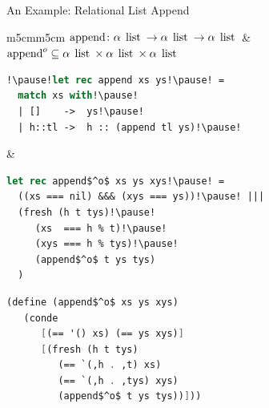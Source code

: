 \documentclass[10pt, mathserif]{beamer}
\let\\\tabularnewline
\let\\\tabularnewline
\newcommand{\oo}[1]{{#1}^o}
\newcommand{\inml}[1]{\mbox{\lstinline{#1}}}
\newcommand{\graybox}[1]{\colorbox{light-gray}{#1}}
\theoremstyle{definition}
\begin{document}
\begin{frame}[fragile]{An Example: Relational List Append}
\vskip5mm
\begin{tabular}{m{5cm}m{5cm}}
 \graybox{$\inml{append} \colon \alpha\:\inml{list} \to \alpha\:\inml{list} \to \alpha\:\inml{list}$} &
 \graybox{$\oo{\inml{append}} \subseteq \alpha\:\inml{list} \times \alpha\:\inml{list} \times \alpha\:\inml{list}$}\\
 \begin{lstlisting}[language=ocaml] 
!\pause!let rec append xs ys!\pause! = 
  match xs with!\pause!
  | []    ->  ys!\pause!
  | h::tl ->  h :: (append tl ys)!\pause!
 \end{lstlisting} &
 \begin{lstlisting}[mathescape=true,language=ocaml]
let rec append$^o$ xs ys xys!\pause! = 
  ((xs === nil) &&& (xys === ys))!\pause! |||  
  (fresh (h t tys)!\pause!
     (xs  === h % t)!\pause! 
     (xys === h % tys)!\pause!
     (append$^o$ t ys tys)
  ) 
 \end{lstlisting}
\end{tabular}\pause
\begin{center}
\begin{minipage}{6cm}
\begin{lstlisting}[mathescape=true,language=scheme]
(define (append$^o$ xs ys xys) 
   (conde 
      [(== '() xs) (== ys xys)]
      [(fresh (h t tys)
         (== `(,h . ,t) xs)
         (== `(,h . ,tys) xys)
         (append$^o$ t ys tys))]))
\end{lstlisting}
\end{minipage}
\end{center}
\vskip5mm
\end{frame}
\end{document}

